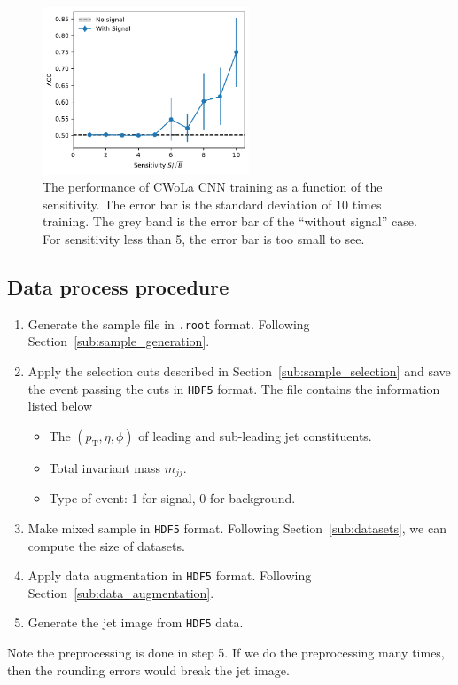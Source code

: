 \documentclass[12pt]{article}
\begin{document}
		\begin{figure}[htpb]
			\centering
			\includegraphics[width=0.55\textwidth]{HVmodel_CWoLa_CNN.pdf}
			\caption{The performance of CWoLa CNN training as a function of the sensitivity. The error bar is the standard deviation of 10 times training. The grey band is the error bar of the ``without signal'' case. For sensitivity less than 5, the error bar is too small to see.}
			\label{fig:cwola_hunting_cnn_acc}
		\end{figure}	
	\subsection{Data process procedure}%
	\label{sub:data_process_procedure}
		\begin{enumerate}
			\item Generate the sample file in \verb|.root| format. Following Section~\ref{sub:sample_generation}.
			\item Apply the selection cuts described in Section~\ref{sub:sample_selection} and save the event passing the cuts in \verb|HDF5| format. The file contains the information listed below 
				\begin{itemize}
					\item The $\left( p_{\text{T}}, \eta, \phi \right) $ of leading and sub-leading jet constituents.
					\item Total invariant mass $m_{jj}$.
					\item Type of event: 1 for signal, 0 for background.	
				\end{itemize}
			\item Make mixed sample in \verb|HDF5| format. Following Section~\ref{sub:datasets}, we can compute the size of datasets.	
			\item Apply data augmentation in \verb|HDF5| format. Following Section~\ref{sub:data_augmentation}.
			\item Generate the jet image from \verb|HDF5| data.
		\end{enumerate}
		Note the preprocessing is done in step 5. If we do the preprocessing many times, then the rounding errors would break the jet image.
\end{document}
